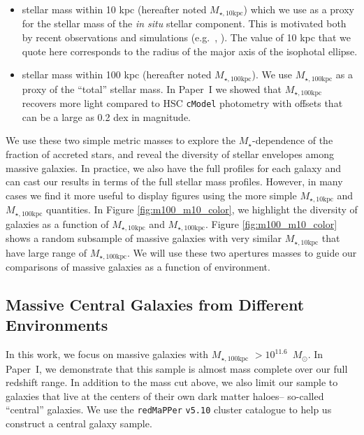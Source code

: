 \documentclass[a4paper,fleqn,usenatbib]{mnras}
\def\msun{$M_\odot$}
\def\redm{\texttt{redMaPPer}}
\def\cmodel{\texttt{cModel}}
\def\mstar{{$M_{\star}$}}
\def\minn{{$M_{\star,10\mathrm{kpc}}$}}
\def\mtot{{$M_{\star,100\mathrm{kpc}}$}}
\begin{document}
    \begin{itemize}
    
        \item stellar mass within 10 kpc (hereafter noted \minn{}) which we use 
            as a proxy for the stellar mass of the \textit{in situ} stellar 
            component. 
            This is motivated both by recent observations and simulations 
            (e.g.~\citealt{vanDokkum2010}, \citealt{RodriguezGomez2016}). 
            The value of 10 kpc that we quote here corresponds to the radius of the 
            major axis of the isophotal ellipse.
            
        \item stellar mass within 100 kpc (hereafter noted \mtot{}). 
            We use \mtot{} as a proxy of the ``total'' stellar mass. 
            In Paper~I we showed that \mtot{} recovers more light compared to 
            HSC \cmodel{} photometry with offsets that can be a large as 0.2 dex 
            in magnitude.        
               
   \end{itemize}
   
   We use these two simple metric masses to explore the \mstar{}-dependence of the 
   fraction of accreted stars, and reveal the diversity of stellar envelopes among 
   massive galaxies. 
   In practice, we also have the full profiles for each galaxy and can cast our 
   results in terms of the full stellar mass profiles. 
   However, in many cases we find it more useful to display figures using the more 
   simple \minn{} and \mtot{} quantities. 
   In Figure \ref{fig:m100_m10_color}, we highlight the diversity of galaxies as a 
   function of \minn{} and \mtot{}. 
   Figure \ref{fig:m100_m10_color} shows a random subsample of massive galaxies with 
   very similar \minn{} that have large range of \mtot{}. 
   We will use these two apertures masses to guide our comparisons of massive galaxies 
   as a function of environment.  
    
\subsection{Massive Central Galaxies from Different Environments}
    \label{ssec:cen}
         
    In this work, we focus on massive galaxies with \mtot{} $>10^{11.6}$~\msun{}. 
    In Paper~I, we demonstrate that this sample is almost mass complete over our full 
    redshift range. 
    In addition to the mass cut above, we also limit our sample to galaxies that live 
    at the centers of their own dark matter haloes-- so-called ``central'' galaxies. 
    We use the \redm{} \texttt{v5.10} \citep{Rykoff2014, Rozo2015b} cluster catalogue 
    to help us construct a central galaxy sample.
    
\end{document}
